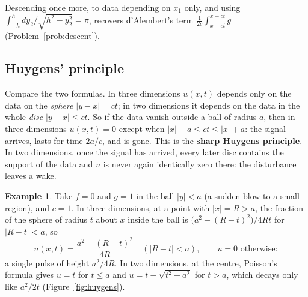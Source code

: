 \documentclass[11pt,a4paper]{article}
\numberwithin{equation}{section}
\theoremstyle{definition}
\newtheorem{exa}[thm]{Example}
\begin{document}
Descending once more, to data depending on $x_1$ only, and using $\int_{-h}^h dy_2/\sqrt{h^2 - y_2^2} = \pi$, recovers d'Alembert's term $\frac1{2c}\int_{x - ct}^{x + ct}g$ (Problem~\ref{prob:descent}).

\subsection{Huygens' principle}
\label{ssec:huygens}

Compare the two formulas. In three dimensions $u(x, t)$ depends only on the data on the \emph{sphere} $|y - x| = ct$; in two dimensions it depends on the data in the whole \emph{disc} $|y - x| \leq ct$. So if the data vanish outside a ball of radius $a$, then in three dimensions $u(x, t) = 0$ except when
$|x| - a \leq ct \leq |x| + a$: the signal arrives, lasts for time $2a/c$, and is gone. This is the \textbf{sharp Huygens principle}. In two dimensions, once the signal has arrived, every later disc contains the support of the data and $u$ is never again identically zero there: the disturbance leaves a wake.

\begin{exa}
\label{ex:huygens}
Take $f = 0$ and $g = 1$ in the ball $|y| < a$ (a sudden blow to a small region), and $c = 1$. In three dimensions, at a point with $|x| = R > a$, the fraction of the sphere of radius $t$ about $x$ inside the ball is $\bigl(a^2 - (R - t)^2\bigr)/4Rt$ for $|R - t| < a$, so
\[
u(x, t) = \frac{a^2 - (R - t)^2}{4R} \quad (|R - t| < a), \qquad u = 0 \text{ otherwise}:
\]
a single pulse of height $a^2/4R$. In two dimensions, at the centre, Poisson's formula gives $u = t$ for $t \leq a$ and $u = t - \sqrt{t^2 - a^2}$ for $t > a$, which decays only like $a^2/2t$ (Figure~\ref{fig:huygens}).
\end{exa}
\end{document}

